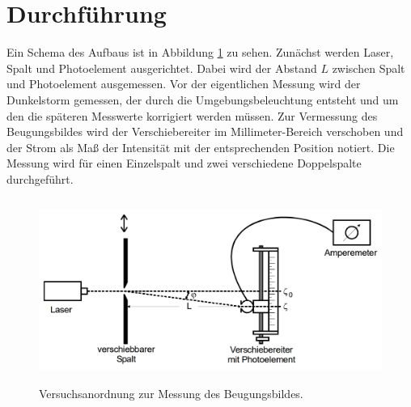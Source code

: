 \section{Durchführung}
\label{sec:Durchführung}

Ein Schema des Aufbaus ist in Abbildung \ref{fig:Schema} zu sehen.
Zunächst werden Laser, Spalt und Photoelement ausgerichtet.
Dabei wird der Abstand $L$ zwischen Spalt und Photoelement ausgemessen.
Vor der eigentlichen Messung wird der Dunkelstorm gemessen, der durch die Umgebungsbeleuchtung entsteht
und um den die späteren Messwerte korrigiert werden müssen.
Zur Vermessung des Beugungsbildes wird der Verschiebereiter im Millimeter-Bereich verschoben und
der Strom als Maß der Intensität mit der entsprechenden Position notiert.
Die Messung wird für einen Einzelspalt und zwei verschiedene Doppelspalte durchgeführt.
\begin{figure}
  \centering
  \includegraphics[height=6cm]{data/Schema.png}
  \caption{Versuchsanordnung zur Messung des Beugungsbildes. \cite{sample}}
  \label{fig:Schema}
\end{figure}

